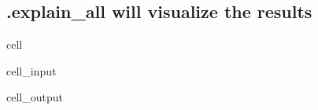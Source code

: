 \documentclass[letterpaper,10pt,english]{jupyterBook}
\begin{document}
\subsection{.explain\_all will visualize the results}
\label{\detokenize{content/06_ModelAnalytics/Attribution:explain-all-will-visualize-the-results}}
\begin{sphinxuseclass}{cell}\begin{sphinxVerbatimInput}

\begin{sphinxuseclass}{cell_input}
\begin{sphinxVerbatim}[commandchars=\\\{\}]
  
\end{sphinxVerbatim}

\end{sphinxuseclass}\end{sphinxVerbatimInput}
\begin{sphinxVerbatimOutput}

\begin{sphinxuseclass}{cell_output}
\noindent{}

\end{sphinxuseclass}\end{sphinxVerbatimOutput}

\end{sphinxuseclass}
\end{document}
